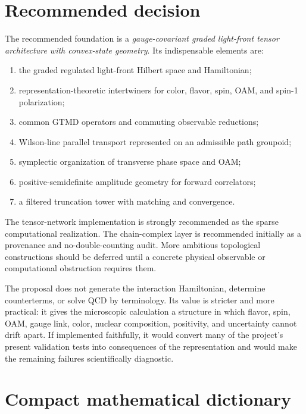 \documentclass[11pt]{article}
\begin{document}
\section{Recommended decision}

The recommended foundation is a
\emph{gauge-covariant graded light-front tensor architecture with
convex-state geometry}.  Its indispensable elements are:
\begin{enumerate}
\item the graded regulated light-front Hilbert space and Hamiltonian;
\item representation-theoretic intertwiners for color, flavor, spin, OAM,
and spin-1 polarization;
\item common GTMD operators and commuting observable reductions;
\item Wilson-line parallel transport represented on an admissible path
groupoid;
\item symplectic organization of transverse phase space and OAM;
\item positive-semidefinite amplitude geometry for forward correlators;
\item a filtered truncation tower with matching and convergence.
\end{enumerate}
The tensor-network implementation is strongly recommended as the sparse
computational realization.  The chain-complex layer is recommended initially
as a provenance and no-double-counting audit.  More ambitious topological
constructions should be deferred until a concrete physical observable or
computational obstruction requires them.

The proposal does not generate the interaction Hamiltonian, determine
counterterms, or solve QCD by terminology.  Its value is stricter and more
practical: it gives the microscopic calculation a structure in which flavor,
spin, OAM, gauge link, color, nuclear composition, positivity, and
uncertainty cannot drift apart.  If implemented faithfully, it would convert
many of the project's present validation tests into consequences of the
representation and would make the remaining failures scientifically
diagnostic.

\appendix
\section{Compact mathematical dictionary}
\end{document}

